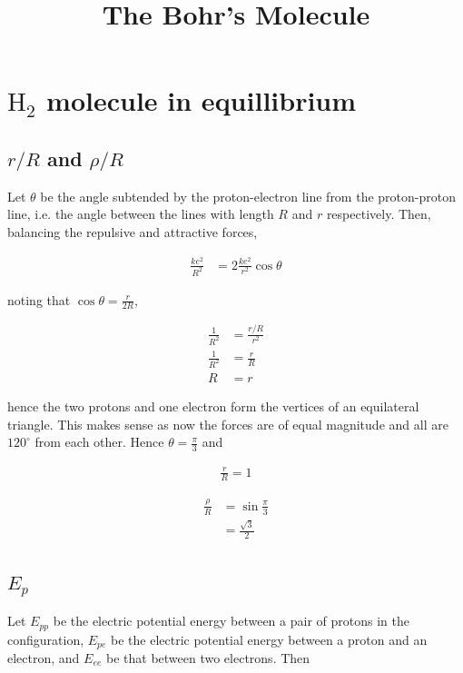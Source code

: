 \documentclass{article}
\title{The Bohr's Molecule}
\date{}
\begin{document}
\maketitle

\section{$\mathrm{H_2}$ molecule in equillibrium}

\subsection{$r/R$ and $\rho/R$}

Let $\theta$ be the angle subtended by the proton-electron line from the proton-proton line, i.e. the angle between the lines with length $R$ and $r$ respectively. Then, balancing the repulsive and attractive forces,

\begin{align*}
\frac{ke^2}{R^2} &= 2 \frac{ke^2}{r^2} \cos\theta
\end{align*}

noting that $\cos\theta = \frac{r}{2R}$,

\begin{align*}
\frac{1}{R^2} &= \frac{r/R}{r^2} \\
\frac{1}{R^2} &= \frac{r}{R} \\
R &= r
\end{align*}

hence the two protons and one electron form the vertices of an equilateral triangle. This makes sense as now the forces are of equal magnitude and all are $120^\circ$ from each other. Hence $\theta = \frac{\pi}{3}$ and

\begin{align*}
\frac{r}{R} = 1
\end{align*}

\begin{align*}
\frac{\rho}{R} &= \sin\frac{\pi}{3} \\
&= \frac{\sqrt 3}{2}
\end{align*}

\subsection{$E_p$}

Let $E_{pp}$ be the electric potential energy between a pair of protons in the configuration, $E_{pe}$ be the electric potential energy between a proton and an electron, and $E_{ee}$ be that between two electrons. Then
\end{document}

